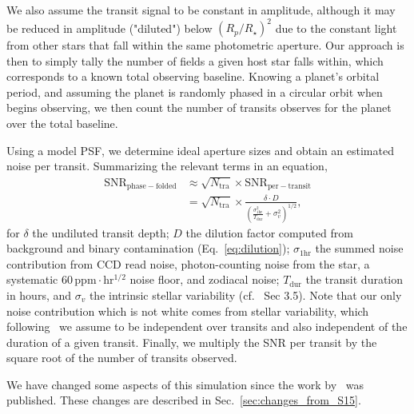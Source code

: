 We also assume the transit signal to be constant in amplitude, although it may be reduced
in amplitude ("diluted") below $(R_p/R_\star)^2$ due to the constant light from other stars
that fall within the same photometric aperture.
Our approach is then to simply tally the number of \tess fields a
given host star falls within, which corresponds to a known total
observing baseline.  Knowing a planet's orbital period, and assuming the
planet is randomly phased in a circular orbit when \tess begins observing, 
we then count the number of transits \tess observes for the planet over the 
total baseline.

Using a model PSF, we determine ideal aperture sizes and obtain 
an estimated noise per transit.
Summarizing the relevant terms in an equation,
\begin{align}
    \mathrm{SNR}_\mathrm{phase-folded} &\approx
	\sqrt{N_\mathrm{tra}} \times \mathrm{SNR}_\mathrm{per-transit}\nonumber \\
	 &= \sqrt{N_\mathrm{tra}} \times 
	\frac{\delta \cdot D}{\left(\frac{\sigma_\mathrm{1hr}^2}{T_\mathrm{dur}} 
		+ \sigma_v^2 \right)^{1/2}}, 
	\label{eq:snr} 
\end{align}
for $\delta$ the undiluted transit depth; $D$ the dilution factor
computed from background and binary contamination (Eq.~\ref{eq:dilution});
$\sigma_\mathrm{1hr}$ the summed noise contribution from CCD read noise, 
photon-counting noise from the star, a systematic 
$60\,\mathrm{ppm\cdot hr^{1/2}}$ noise floor, and zodiacal noise;
$T_\mathrm{dur}$ the transit duration in hours, and $\sigma_v$ the intrinsic
stellar variability (cf.~ Sec 3.5).
Note that our only noise contribution which is not white comes from stellar 
variability, 
which following~ we assume to be independent over 
transits and also independent of the duration of a given transit.
Finally, we multiply the SNR per transit by the square root of the number of transits
observed.

We have changed some aspects of this simulation
since the work by~ was published. These
changes are described in Sec.~\ref{sec:changes_from_S15}.
